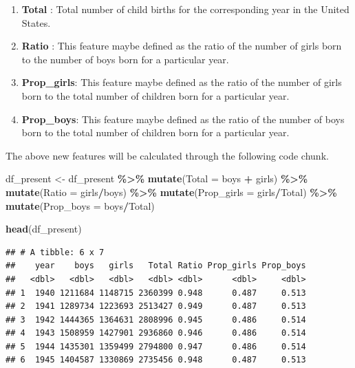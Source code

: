 \documentclass[11pt,a4paper,]{article}
\newenvironment{Shaded}{\begin{snugshade}}{\end{snugshade}}
\newcommand{\AttributeTok}[1]{\textcolor[rgb]{0.13,0.29,0.53}{#1}}
\newcommand{\FunctionTok}[1]{\textcolor[rgb]{0.13,0.29,0.53}{\textbf{#1}}}
\newcommand{\NormalTok}[1]{#1}
\newcommand{\OtherTok}[1]{\textcolor[rgb]{0.56,0.35,0.01}{#1}}
\newcommand{\SpecialCharTok}[1]{\textcolor[rgb]{0.81,0.36,0.00}{\textbf{#1}}}
\providecommand{\tightlist}{%
  \setlength{\itemsep}{0pt}\setlength{\parskip}{0pt}}
\begin{document}
\begin{enumerate}
\def\labelenumi{\arabic{enumi}.}
\tightlist
\item
  \textbf{Total} : Total number of child births for the corresponding year in the United States.
\item
  \textbf{Ratio} : This feature maybe defined as the ratio of the number of girls born to the number of boys born for a particular year.
\item
  \textbf{Prop\_girls}: This feature maybe defined as the ratio of the number of girls born to the total number of children born for a particular year.
\item
  \textbf{Prop\_boys}: This feature maybe defined as the ratio of the number of boys born to the total number of children born for a particular year.
\end{enumerate}

The above new features will be calculated through the following code chunk.

\tiny

\begin{Shaded}
\begin{Highlighting}[]
\NormalTok{df\_present }\OtherTok{\textless{}{-}}\NormalTok{ df\_present }\SpecialCharTok{\%\textgreater{}\%} \FunctionTok{mutate}\NormalTok{(}\AttributeTok{Total =}\NormalTok{ boys }\SpecialCharTok{+}\NormalTok{ girls) }\SpecialCharTok{\%\textgreater{}\%} 
  \FunctionTok{mutate}\NormalTok{(}\AttributeTok{Ratio =}\NormalTok{ girls}\SpecialCharTok{/}\NormalTok{boys) }\SpecialCharTok{\%\textgreater{}\%} 
  \FunctionTok{mutate}\NormalTok{(}\AttributeTok{Prop\_girls =}\NormalTok{ girls}\SpecialCharTok{/}\NormalTok{Total) }\SpecialCharTok{\%\textgreater{}\%} 
  \FunctionTok{mutate}\NormalTok{(}\AttributeTok{Prop\_boys =}\NormalTok{ boys}\SpecialCharTok{/}\NormalTok{Total)}

\FunctionTok{head}\NormalTok{(df\_present)}
\end{Highlighting}
\end{Shaded}

\begin{verbatim}
## # A tibble: 6 x 7
##    year    boys   girls   Total Ratio Prop_girls Prop_boys
##   <dbl>   <dbl>   <dbl>   <dbl> <dbl>      <dbl>     <dbl>
## 1  1940 1211684 1148715 2360399 0.948      0.487     0.513
## 2  1941 1289734 1223693 2513427 0.949      0.487     0.513
## 3  1942 1444365 1364631 2808996 0.945      0.486     0.514
## 4  1943 1508959 1427901 2936860 0.946      0.486     0.514
## 5  1944 1435301 1359499 2794800 0.947      0.486     0.514
## 6  1945 1404587 1330869 2735456 0.948      0.487     0.513
\end{verbatim}
\end{document}
